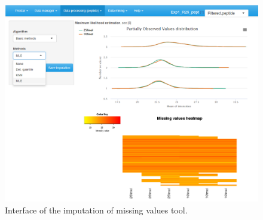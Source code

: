 \documentclass[12pt]{article}
\begin{document}
\begin {figure}
\includegraphics[width=\textwidth]{images/peptide-basicImputation.png}
\caption{Interface of the imputation of missing values tool.}\label{fig:peptide-bimp}
\end {figure}
\end{document}

